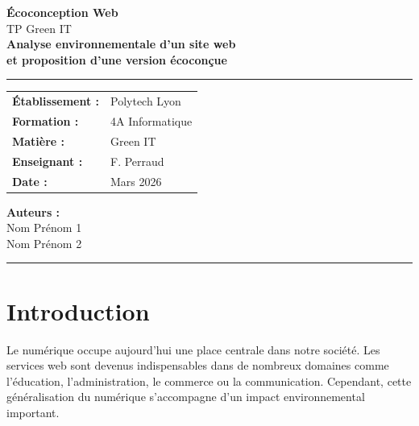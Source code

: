 \documentclass[11pt,a4paper]{article}
\begin{document}

\begin{titlepage}
\centering

\vspace*{2cm}

{\Huge \textbf{Écoconception Web}}\\[0.5cm]
{\Large TP Green IT}\\[2cm]

{\large \textbf{Analyse environnementale d’un site web}\\
\textbf{et proposition d’une version écoconçue}}\\[2cm]

\rule{\textwidth}{0.5pt}

\vspace{1cm}

\begin{tabular}{ll}
\textbf{Établissement :} & Polytech Lyon \\
\textbf{Formation :} & 4A Informatique \\
\textbf{Matière :} & Green IT \\
\textbf{Enseignant :} & F. Perraud \\
\textbf{Date :} & Mars 2026 \\
\end{tabular}

\vfill

\textbf{Auteurs :}\\
Nom Prénom 1\\
Nom Prénom 2

\vspace{1cm}

\rule{\textwidth}{0.5pt}

\vspace*{1cm}

\end{titlepage}

\tableofcontents
\newpage

\section{Introduction}

Le numérique occupe aujourd'hui une place centrale dans notre société. Les services web sont devenus indispensables dans de nombreux domaines comme l'éducation, l'administration, le commerce ou la communication. Cependant, cette généralisation du numérique s'accompagne d'un impact environnemental important.
\end{document}
